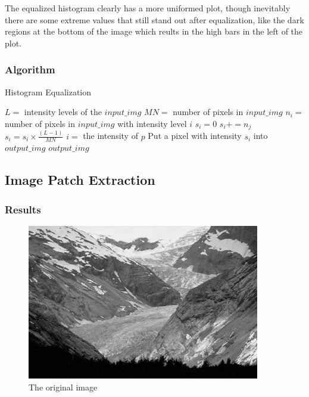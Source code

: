 \documentclass{article}
\begin{document}
The equalized histogram clearly has a more uniformed plot, though inevitably there are some extreme values that still stand out after equalization, like the dark regions at the bottom of the image which reults in the high bars in the left of the plot.

\subsubsection{Algorithm}

\begin{algorithm}[H]
\centering
\caption{Histogram Equalization}
  \begin{algorithmic}[1]
     \State $L = $ intensity levels of the $input\_img$
     \State $MN = $ number of pixels in $input\_img$
      	\State $n_i = $ number of pixels in $input\_img$ with intensity level $i$
      	\State $s_i = 0$
      		\State $s_i += n_j$
      	\EndFor
      	\State $s_i = s_i \times \frac{(L - 1)}{MN}$
      \EndFor
      	\State $i = $ the intensity of $p$
      	\State Put a pixel with intensity $s_i$ into $output\_img$
      \EndFor
      \State \Return $output\_img$
    \EndFunction
  \end{algorithmic}
\end{algorithm}


\subsection{Image Patch Extraction}

\subsubsection{Results}
\begin{figure}[H]
	\centering
	\includegraphics[width=288pt]{../img/02.png}
	\caption{The original image}
\end{figure}
\end{document}
